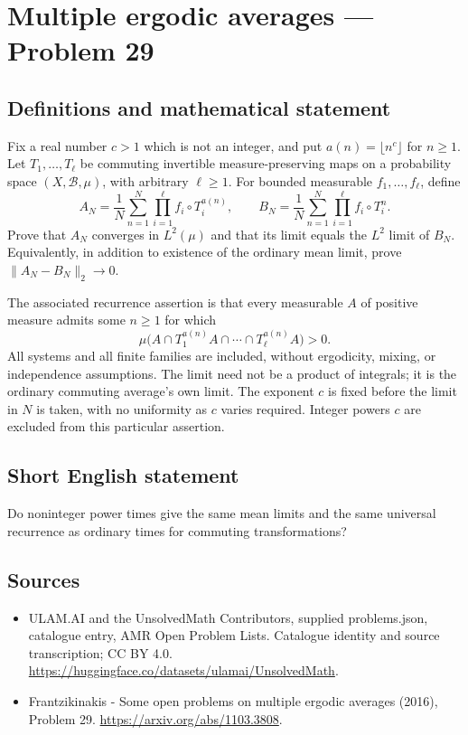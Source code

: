 \documentclass[11pt,a4paper]{article}
\begin{document}
\section*{Multiple ergodic averages — Problem 29}\label{statement}

\subsection{Definitions and mathematical statement}
Fix a real number $c>1$ which is not an integer,
and put $a(n)=\lfloor n^c\rfloor$ for $n\ge1$.
Let $T_1,\ldots,T_\ell$ be commuting invertible
measure-preserving maps on a probability space
$(X,\mathcal B,\mu)$, with arbitrary $\ell\ge1$.
For bounded measurable $f_1,\ldots,f_\ell$, define
\[
 A_N=\frac1N\sum_{n=1}^N\prod_{i=1}^\ell f_i\circ T_i^{a(n)},
 \qquad
 B_N=\frac1N\sum_{n=1}^N\prod_{i=1}^\ell f_i\circ T_i^n.
\]
Prove that $A_N$ converges in $L^2(\mu)$ and
that its limit equals the $L^2$ limit of $B_N$.
Equivalently, in addition to existence of the
ordinary mean limit, prove $\|A_N-B_N\|_2\to0$.

The associated recurrence assertion is that every
measurable $A$ of positive measure admits some
$n\ge1$ for which
\[
       \mu\bigl(A\cap T_1^{a(n)}A\cap\cdots
                             \cap T_\ell^{a(n)}A\bigr)>0.
\]
All systems and all finite families are included,
without ergodicity, mixing, or independence
assumptions. The limit need not be a product
of integrals; it is the ordinary commuting
average's own limit. The exponent $c$ is fixed
before the limit in $N$ is taken, with no
uniformity as $c$ varies required. Integer powers
$c$ are excluded from this particular assertion.
\subsection{Short English statement}
Do noninteger power times give the same mean limits and the same universal recurrence as ordinary times for commuting transformations?
\subsection{Sources}
\begin{itemize}
\item[S1] ULAM.AI and the UnsolvedMath Contributors, supplied problems.json, catalogue entry, AMR Open Problem Lists. Catalogue identity and source transcription; CC BY 4.0.
\url{https://huggingface.co/datasets/ulamai/UnsolvedMath}.
\item[S2] Frantzikinakis - Some open problems on multiple ergodic averages (2016), Problem 29. 
\url{https://arxiv.org/abs/1103.3808}.
\end{itemize}
\end{document}
